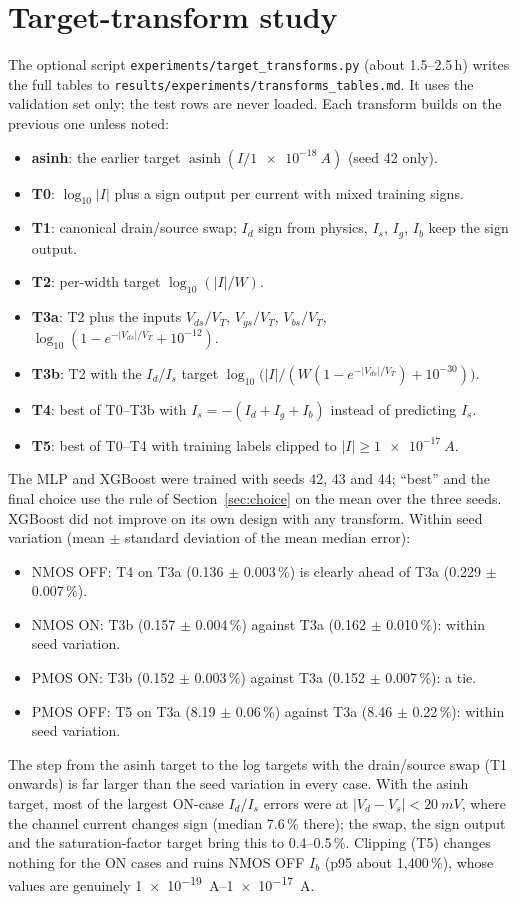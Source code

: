 \documentclass[11pt,a4paper]{article}
\begin{document}
\section{Target-transform study}
\label{app:tt}
The optional script \texttt{experiments/\allowbreak target\_transforms.py} (about 1.5--2.5\,h) writes the
full tables to \texttt{results/\allowbreak experiments/\allowbreak transforms\_tables.md}. It uses the
validation set only; the test rows are never loaded. Each transform builds on the previous one unless noted:
\begin{itemize}[itemsep=1pt]
  \item \textbf{asinh}: the earlier target $\operatorname{asinh}(I/\SI{1e-18}{A})$ (seed 42 only).
  \item \textbf{T0}: $\log_{10}|I|$ plus a sign output per current with mixed training signs.
  \item \textbf{T1}: canonical drain/source swap; $I_d$ sign from physics, $I_s$, $I_g$, $I_b$ keep the sign output.
  \item \textbf{T2}: per-width target $\log_{10}(|I|/W)$.
  \item \textbf{T3a}: T2 plus the inputs $V_{ds}/V_T$, $V_{gs}/V_T$, $V_{bs}/V_T$, $\log_{10}(1-e^{-|V_{ds}|/V_T}+10^{-12})$.
  \item \textbf{T3b}: T2 with the $I_d$/$I_s$ target $\log_{10}\bigl(|I|/(W(1-e^{-|V_{ds}|/V_T})+10^{-30})\bigr)$.
  \item \textbf{T4}: best of T0--T3b with $I_s = -(I_d+I_g+I_b)$ instead of predicting $I_s$.
  \item \textbf{T5}: best of T0--T4 with training labels clipped to $|I| \ge \SI{1e-17}{A}$.
\end{itemize}
The MLP and XGBoost were trained with seeds 42, 43 and 44; ``best'' and the final choice use the rule
of Section~\ref{sec:choice} on the mean over the three seeds. XGBoost did not improve on its own design
with any transform. Within seed variation (mean $\pm$ standard deviation of the mean median error):
\begin{itemize}[itemsep=1pt]
  \item NMOS OFF: T4 on T3a (0.136 $\pm$ 0.003\,\%) is clearly ahead of T3a (0.229 $\pm$ 0.007\,\%).
  \item NMOS ON: T3b (0.157 $\pm$ 0.004\,\%) against T3a (0.162 $\pm$ 0.010\,\%): within seed variation.
  \item PMOS ON: T3b (0.152 $\pm$ 0.003\,\%) against T3a (0.152 $\pm$ 0.007\,\%): a tie.
  \item PMOS OFF: T5 on T3a (8.19 $\pm$ 0.06\,\%) against T3a (8.46 $\pm$ 0.22\,\%): within seed variation.
\end{itemize}
The step from the asinh target to the log targets with the drain/source swap (T1 onwards) is far larger
than the seed variation in every case. With the asinh target, most of the largest ON-case $I_d$/$I_s$
errors were at $|V_d - V_s| < \SI{20}{mV}$, where the channel current changes sign (median 7.6\,\% there);
the swap, the sign output and the saturation-factor target bring this to 0.4--0.5\,\%. Clipping (T5)
changes nothing for the ON cases and ruins NMOS OFF $I_b$ (p95 about 1{,}400\,\%), whose values are
genuinely \SIrange{1e-19}{1e-17}{A}.
\end{document}
